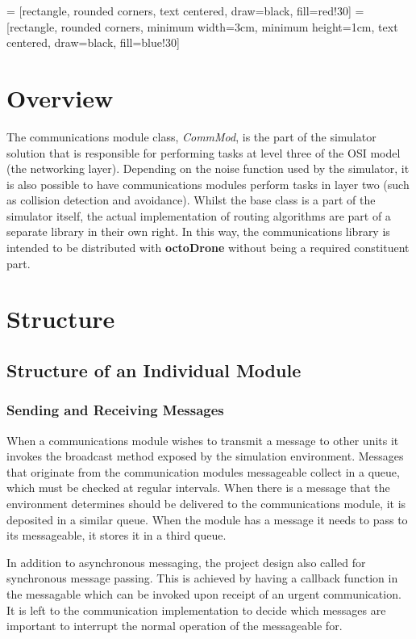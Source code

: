  = [rectangle, rounded corners, text centered, draw=black, fill=red!30]
 = [rectangle, rounded corners, minimum width=3cm, minimum height=1cm, text centered, draw=black, fill=blue!30]

\section{Overview}
The communications module class, \textit{CommMod}, is the part of the simulator solution that is responsible for performing tasks at level three of the OSI model (the networking layer). Depending on the noise function used by the simulator, it is also possible to have communications modules perform tasks in layer two (such as collision detection and avoidance). Whilst the base class is a part of the simulator itself, the actual implementation of routing algorithms are part of a separate library in their own right. In this way, the communications library is intended to be distributed with \textbf{octoDrone} without being a required constituent part.

\section{Structure}
\subsection{Structure of an Individual Module}
\subsubsection{Sending and Receiving Messages}
		
When a communications module wishes to transmit a message to other units it invokes the broadcast method exposed by the simulation environment. Messages that originate from the communication modules messageable collect in a queue, which must be checked at regular intervals. When there is a message that the environment determines should be delivered to the communications module, it is deposited in a similar queue. When the module has a message it needs to pass to its messageable, it stores it in a third queue.

In addition to asynchronous messaging, the project design also called for synchronous message passing. This is achieved by having a callback function in the messagable which can be invoked upon receipt of an urgent communication. It is left to the communication implementation to decide which messages are important to interrupt the normal operation of the messageable for.
		

